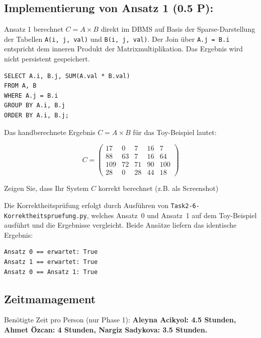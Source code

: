 \documentclass[11pt]{scrartcl}
\begin{document}
\subsection*{Implementierung von Ansatz 1 (0.5 P):}

Ansatz 1 berechnet $C = A \times B$ direkt im DBMS auf Basis der Sparse-Darstellung
der Tabellen \texttt{A(i, j, val)} und \texttt{B(i, j, val)}.
Der Join über \texttt{A.j = B.i} entspricht dem inneren Produkt der Matrixmultiplikation.
Das Ergebnis wird nicht persistent gespeichert.

\begin{lstlisting}[style=dmrsql]
SELECT A.i, B.j, SUM(A.val * B.val)
FROM A, B
WHERE A.j = B.i
GROUP BY A.i, B.j
ORDER BY A.i, B.j;
\end{lstlisting}

Das handberechnete Ergebnis $C = A \times B$ für das Toy-Beispiel lautet:

\[
C = \begin{pmatrix}
 17 &  0 &  7 & 16 &   7 \\
 88 & 63 &  7 & 16 &  64 \\
109 & 72 & 71 & 90 & 100 \\
 28 &  0 & 28 & 44 &  18
\end{pmatrix}
\]

Zeigen Sie, dass Ihr System $C$ korrekt berechnet (z.B. als Screenshot)

Die Korrektheitsprüfung erfolgt durch Ausführen von \texttt{Task2-6-Korrektheitspruefung.py},
welches Ansatz~0 und Ansatz~1 auf dem Toy-Beispiel ausführt und die Ergebnisse vergleicht.
Beide Ansätze liefern das identische Ergebnis:

\begin{lstlisting}[style=dmrsql]
Ansatz 0 == erwartet: True
Ansatz 1 == erwartet: True
Ansatz 0 == Ansatz 1: True
\end{lstlisting}

\subsection*{Zeitmamagement}

Benötigte Zeit pro Person (nur Phase 1): \textbf{Aleyna Acikyol: 4.5 Stunden, Ahmet Özcan: 4 Stunden, Nargiz Sadykova: 3.5 Stunden.}
\end{document}
